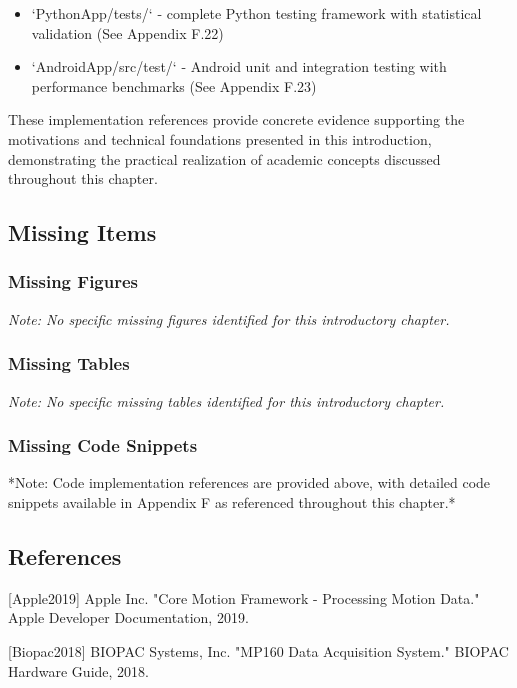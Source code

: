 \documentclass[11pt,a4paper]{article}
\begin{document}
\begin{itemize}
\item `PythonApp/tests/` - complete Python testing framework with statistical validation (See Appendix F.22)
\item `AndroidApp/src/test/` - Android unit and integration testing with performance benchmarks (See Appendix F.23)

\end{itemize}
These implementation references provide concrete evidence supporting the motivations
and technical foundations presented
in this introduction, demonstrating the practical realization of academic concepts
discussed throughout this chapter.

\subsection{Missing Items}

\subsubsection{Missing Figures}

\textit{Note: No specific missing figures identified for this introductory chapter.}

\subsubsection{Missing Tables}

\textit{Note: No specific missing tables identified for this introductory chapter.}

\subsubsection{Missing Code Snippets}

*Note: Code implementation references are provided above, with detailed code snippets
available in Appendix F as
referenced throughout this chapter.*

\subsection{References}

[Apple2019] Apple Inc.  "Core Motion Framework - Processing Motion Data." Apple
Developer Documentation, 2019.

[Biopac2018] BIOPAC Systems, Inc.  "MP160 Data Acquisition System." BIOPAC Hardware
Guide, 2018.
\end{document}
